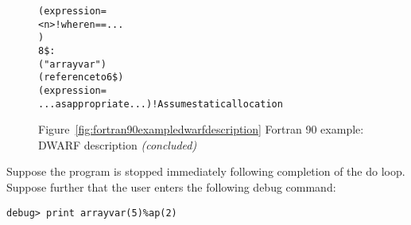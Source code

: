 \begin{figure}
\begin{dwflisting}
\begin{alltt}
            (expression=
                <n>            ! where n == ...
                )
8\$: 
        ("arrayvar")
        (reference to 6\$)
        (expression=
            ...as appropriate...)       ! Assume static allocation
\end{alltt}
\end{dwflisting}
\begin{center}

Figure~\ref{fig:fortran90exampledwarfdescription} Fortran 90 example: DWARF description \textit{(concluded)}
\end{center}
\end{figure}

Suppose 
the program is stopped immediately following completion
of the do loop. Suppose further that the user enters the
following debug command:

\begin{lstlisting}[numbers=none]
debug> print arrayvar(5)%ap(2)
\end{lstlisting}

